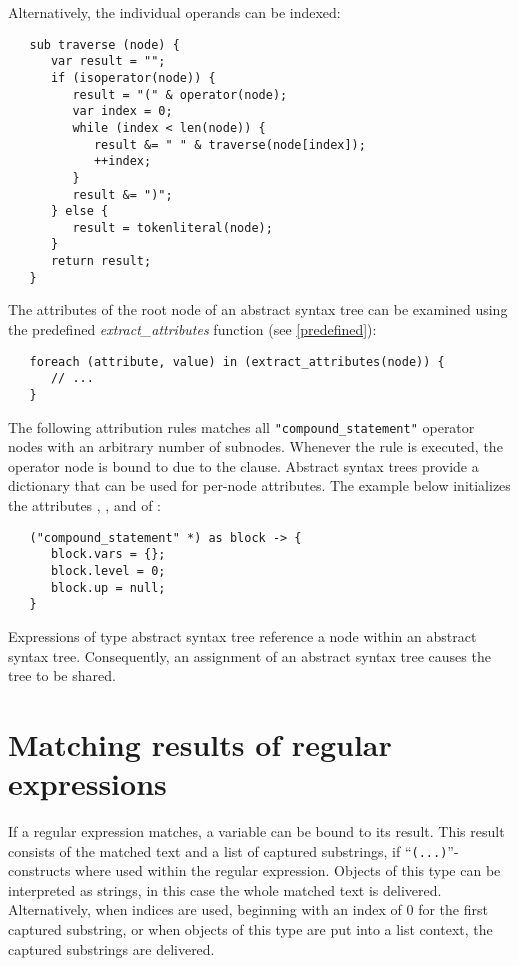 \noindent
Alternatively, the individual operands can be indexed:

\begin{lstlisting}
   sub traverse (node) {
      var result = "";
      if (isoperator(node)) {
         result = "(" & operator(node);
         var index = 0;
         while (index < len(node)) {
            result &= " " & traverse(node[index]);
            ++index;
         }
         result &= ")";
      } else {
         result = tokenliteral(node);
      }
      return result;
   }
\end{lstlisting}

\noindent
The attributes of the root node of an abstract syntax tree
can be examined using the predefined
\textit{extract\_attributes}
function (see \ref{predefined}):

\begin{lstlisting}
   foreach (attribute, value) in (extract_attributes(node)) {
      // ...
   }
\end{lstlisting}

\noindent
The following attribution rules matches all \lstinline!"compound_statement"!
operator nodes with an arbitrary number of subnodes. Whenever the rule
is executed, the operator node is bound to  due to the
 clause. Abstract syntax trees provide a dictionary that
can be used for per-node attributes. The example below initializes the
attributes , , and  of :

\begin{lstlisting}
   ("compound_statement" *) as block -> {
      block.vars = {};
      block.level = 0;
      block.up = null;
   }
\end{lstlisting}

\noindent
Expressions of type abstract syntax tree reference a node within an
abstract syntax tree. Consequently, an assignment of an abstract syntax
tree causes the tree to be shared.

\section{Matching results of regular expressions}\label{matchresult}

If a regular expression matches, a variable can be bound to its
result. This result consists of the matched text and a list
of captured substrings, if ``\lstinline!(...)!''-constructs
where used within the regular expression. Objects of this
type can be interpreted as strings, in this case the whole
matched text is delivered. Alternatively, when indices are
used, beginning with an index of 0 for the first captured substring,
or when objects of this type are put into a list context,
the captured substrings are delivered.


